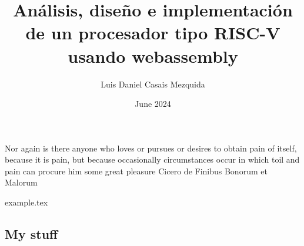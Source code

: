 \documentclass[en]{uc3mthesisIEEE}
\begin{document}
  \title{Análisis, diseño e implementación de un procesador tipo RISC-V usando webassembly}
  \author{Luis Daniel Casais Mezquida}
  \date{June 2024}


  \makecover

  \makeepigraph
    {Nor again is there anyone who loves or pursues or desires to obtain pain of itself, because it is pain, but because occasionally circumstances occur in which toil and pain can procure him some great pleasure}  %
    {Cicero}  %
    {de Finibus Bonorum et Malorum}  %


  \begin{abstract}
    \lipsum[1-3]
  \end{abstract}


  \begin{acknowledgements}
    \lipsum[1]
  \end{acknowledgements}


  \tableofcontents
  \listoffigures
  \listoftables


  \begin{thesis}
    \newpage
    {example.tex}
  \end{thesis}


  \makebibliography


  \begin{appendices}
    \chapter{My stuff}
    \lipsum
  \end{appendices}
\end{document}
